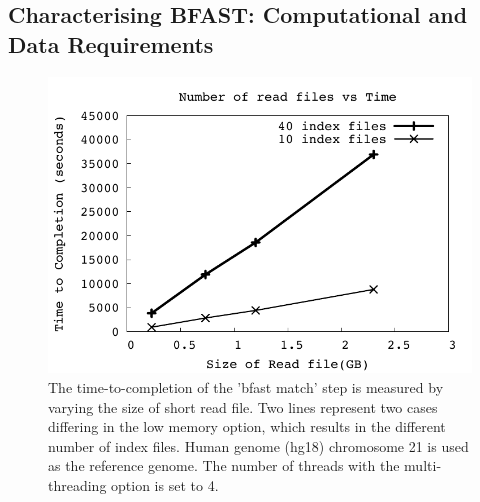 \documentclass{acm_proc_article-sp}
\begin{document}
\subsection{Characterising BFAST: Computational and Data Requirements}


\begin{figure}
 \centering
\includegraphics[scale=0.66]{figures/readsvstime.pdf}

\caption{\small The time-to-completion of the 'bfast match' step is
  measured by varying the size of short read file.  Two lines
  represent two cases differing in the low memory option, which
  results in the different number of index files.  Human genome (hg18)
  chromosome 21 is used as the reference genome. The number of threads with the multi-threading option is set to 4.}
  \label{fig:parallel-execution} 
 \end{figure}
\end{document}
